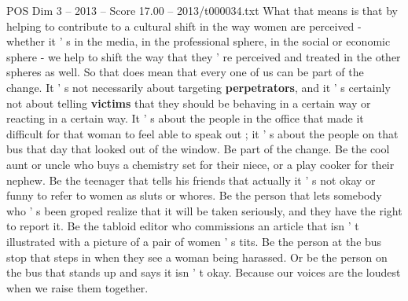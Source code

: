 \begin{textsample}{POS Dim 3 – 2013 – Score 17.00 – 2013/t000034.txt}
What that means is that by helping to contribute to a cultural shift in the way women are perceived - whether it ' s in the media, in the professional sphere, in the social or economic sphere - we help to shift the way that they ' re perceived and treated in the other spheres as well.
So that does mean that every one of us can be part of the change.
It ' s not necessarily about targeting \textbf{perpetrators}, and it ' s certainly not about telling \textbf{victims} that they should be behaving in a certain way or reacting in a certain way.
It ' s about the people in the office that made it difficult for that woman to feel able to speak out ; it ' s about the people on that bus that day that looked out of the window.
Be part of the change.
Be the cool aunt or uncle who buys a chemistry set for their niece, or a play cooker for their nephew.
Be the teenager that tells his friends that actually it ' s not okay or funny to refer to women as sluts or whores.
Be the person that lets somebody who ' s been groped realize that it will be taken seriously, and they have the right to report it.
Be the tabloid editor who commissions an article that isn ' t illustrated with a picture of a pair of women ' s tits.
Be the person at the bus stop that steps in when they see a woman being harassed.
Or be the person on the bus that stands up and says it isn ' t okay.
Because our voices are the loudest when we raise them together.

\end{textsample}
